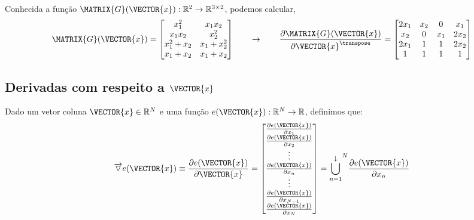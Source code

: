 \begin{example}
Conhecida a função $\MATRIX{G}(\VECTOR{x}): \mathbb{R}^2 \rightarrow \mathbb{R}^{3 \times 2}$, podemos calcular,
\begin{equation}
\MATRIX{G}(\VECTOR{x})=
\begin{bmatrix}
x_1^2       & x_1 x_2\\
x_1 x_2     & x_2^2\\
x_1^2 + x_2 & x_1 + x_2^2\\
x_1 + x_2   & x_1 + x_2
\end{bmatrix}
\qquad \rightarrow \qquad
\frac{\partial \MATRIX{G}(\VECTOR{x}) }{\partial \VECTOR{x}^{\transpose}}= 
\begin{bmatrix}
2 x_1 & x_2 & 0   &   x_1\\
  x_2 & 0   & x_1 & 2 x_2\\
2 x_1 & 1   & 1   & 2 x_2\\
    1 & 1   & 1   & 1
\end{bmatrix}
\end{equation}
\end{example}
\subsection{Derivadas com respeito a $\VECTOR{x}$}

\begin{definition}\label{def:deltaver}
Dado 
um vetor coluna $\VECTOR{x}\in \mathbb{R}^N$ e 
uma função $e(\VECTOR{x}): \mathbb{R}^N \rightarrow \mathbb{R}$,
definimos que:
\begin{equation}
\overrightarrow{\triangledown} e(\VECTOR{x}) \equiv 
\frac{\partial e(\VECTOR{x}) }{\partial \VECTOR{x}}= 
\left[
\begin{matrix}
\frac{\partial e(\VECTOR{x}) }{\partial x_{1}} \\
\frac{\partial e(\VECTOR{x}) }{\partial x_{2}} \\
\vdots \\
\frac{\partial e(\VECTOR{x}) }{\partial x_{n}} \\
\vdots \\
\frac{\partial e(\VECTOR{x}) }{\partial x_{N-1}} \\
\frac{\partial e(\VECTOR{x}) }{\partial x_{N}} 
\end{matrix}
\right] = 
{\bigcup\limits_{n=1}^{\downarrow}}^{N}{\frac{\partial e(\VECTOR{x}) }{\partial x_{n}}} 
\end{equation}
\end{definition}

